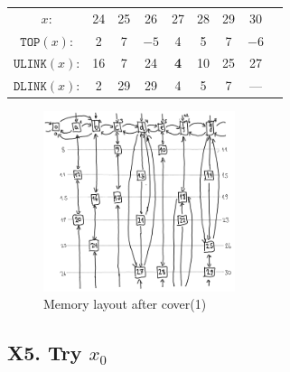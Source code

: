 \documentclass[a4paper,landscape,11pt]{article}
\begin{document}
\begin{table}[h!]
\begin{center}
\begin{tabular}{c c c c c c c c c }
			\hline
			$x$:                 & 24         & 25 & 26         & 27         & 28          & 29 & 30          &      \\
			$\texttt{TOP}(x)$:   & 2          & 7  & $-5$       & 4          & 5           & 7  & $-6$        &      \\
			$\texttt{ULINK}(x)$: & 16         & 7  & 24         & \textbf{4} & 10          & 25 & 27          &      \\
			$\texttt{DLINK}(x)$: & 2          & 29 & 29         & 4          & 5           & 7  & ---         &      \\
		\end{tabular}
	\end{center}
\end{table}

\begin{figure}[h]
	\caption{Memory layout after cover(1)}
	\centering
	\includegraphics[width=0.5\textwidth]{vol4b_ex11_p125_2.png}
\end{figure}

\subsection{X5. Try $x_0$}
\end{document}

